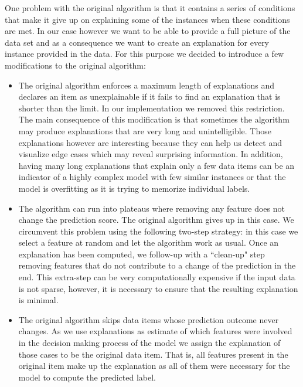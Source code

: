One problem with the original algorithm is that it contains a series of conditions that make it give up on explaining some of the instances when these conditions are met. In our case however we want to be able to provide a full picture of the data set and as a consequence we want to create an explanation for every instance provided in the data.
%
For this purpose we decided to introduce a few modifications to the original algorithm:
%
%
\begin{itemize}
    \item The original algorithm enforces a maximum length of explanations and declares an item as unexplainable if it fails to find an explanation that is shorter than the limit. In our implementation we removed this restriction. The main consequence of this modification is that sometimes the algorithm may produce explanations that are very long and unintelligible. Those explanations however are interesting because they can help us detect and visualize edge cases which may reveal surprising information. In addition, having many long explanations that explain only a few data items can be an indicator of a highly complex model with few similar instances or that the model is overfitting as it is trying to memorize individual labels. 

\vspace*{-0.5em}
    \item The algorithm can run into plateaus where removing any feature does not change the prediction score. The original algorithm gives up in this case. We circumvent this problem using the following two-step strategy: in this case we select a feature at random and let the algorithm work as usual. Once an explanation has been computed, we follow-up with a ``clean-up" step removing features that do not contribute to a change of the prediction in the end. This extra-step can be very computationally expensive if the input data is not sparse, however, it is necessary to ensure that the resulting explanation is minimal.
    
    \item The original algorithm skips data items whose prediction outcome never changes. As we use explanations as estimate of which features were involved in the decision making process of the model we assign the explanation of those cases to be the original data item. That is, all features present in the original item make up the explanation as all of them were necessary for the model to compute the predicted label.
\end{itemize}
